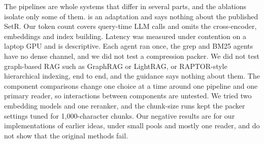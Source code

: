 The pipelines are whole systems that differ in several parts, and the ablations isolate only some of them. \setr{} is an adaptation and says nothing about the published SetR. Our token count covers query-time LLM calls and omits the cross-encoder, embeddings and index building. Latency was measured under contention on a laptop GPU and is descriptive. Each agent ran once, the grep and BM25 agents have no dense channel, and we did not test a compression packer. We did not test graph-based RAG such as GraphRAG or LightRAG, or RAPTOR-style hierarchical indexing, end to end, and the guidance says nothing about them. The component comparisons change one choice at a time around one pipeline and one primary reader, so interactions between components are untested. We tried two embedding models and one reranker, and the chunk-size runs kept the packer settings tuned for 1,000-character chunks. Our negative results are for our implementations of earlier ideas, under small pools and mostly one reader, and do not show that the original methods fail.
